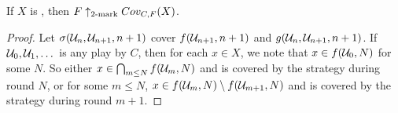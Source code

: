   \begin{theorem}
    If $X$ is \scish, then $F \uparrow_{2\text{-mark}}Cov_{C,F}(X)$.
  \end{theorem}

  \begin{proof}
    Let $\sigma(\mathcal{U}_n,\mathcal{U}_{n+1},n+1)$ cover $f(\mathcal{U}_{n+1},n+1)$ and $g(\mathcal{U}_n,\mathcal{U}_{n+1},n+1)$. If $\mathcal{U}_0,\mathcal{U}_1,\dots$ is any play by $C$, then for each $x\in X$, we note that $x\in f(\mathcal{U}_0,N)$ for some $N$. So either $x\in \bigcap_{m\leq N} f(\mathcal{U}_m,N)$ and is covered by the strategy during round $N$, or for some $m\leq N$, $x \in f(\mathcal{U}_m,N)\setminus f(\mathcal{U}_{m+1},N)$ and is covered by the strategy during round $m+1$.
  \end{proof}

